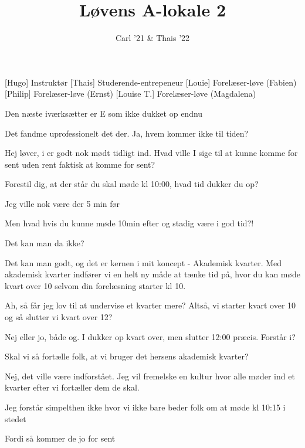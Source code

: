 \documentclass[a4paper,11pt]{article}
\title{Løvens A-lokale 2}
\author{Carl '21 \& Thais '22}
\begin{document}
\maketitle

\begin{roles}
[Hugo] Instruktør
[Thais] Studerende-entrepeneur
[Louie] Forelæser-løve (Fabien)
[Philip] Forelæser-løve (Ernst)
[Louise T.] Forelæser-løve (Magdalena)
\end{roles}

\begin{sketch}
 Den næste iværksætter er E som ikke dukket op endnu

 Det fandme uprofessionelt det der. 
 Ja, hvem kommer ikke til tiden?

 Hej løver, i er godt nok mødt tidligt ind. Hvad ville I sige til at kunne komme for sent uden rent faktisk at komme for sent?


 Forestil dig, at der står du skal møde kl  10:00, hvad tid dukker du op? 

 Jeg ville nok være der 5 min før

 Men hvad hvis du kunne møde 10min efter og stadig være i god tid?!

 Det kan man da ikke?

 Det kan man godt, og det er kernen i mit koncept - Akademisk kvarter. Med akademisk kvarter indfører vi en helt ny måde at tænke tid på, hvor du kan møde kvart over 10 selvom din forelæsning starter kl 10.

 Ah, så får jeg lov til at undervise et kvarter mere? Altså, vi starter kvart over 10 og så slutter vi kvart over 12?

 Nej eller jo, både og. I dukker op kvart over, men slutter 12:00 præcis. Forstår i?


 Skal vi så fortælle folk, at vi bruger det hersens akademisk kvarter?

 Nej, det ville være indforstået. Jeg vil fremelske en kultur hvor alle møder ind et kvarter efter vi fortæller dem de skal.

 Jeg forstår simpelthen ikke hvor vi ikke bare beder folk om at møde kl 10:15 i stedet

 Fordi så kommer de jo for sent 


\end{sketch}
\end{document}
